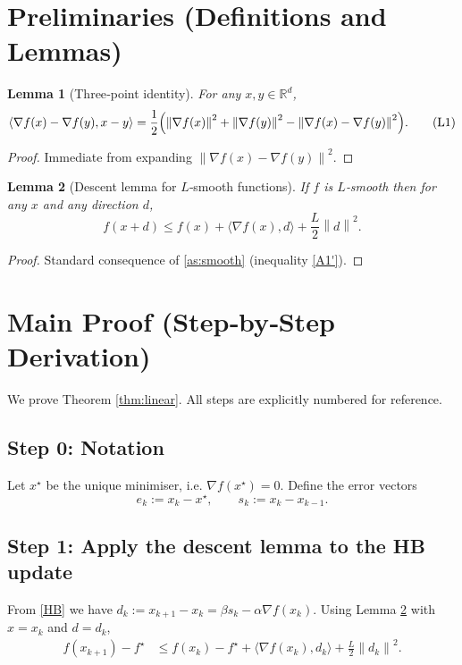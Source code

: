 \documentclass[11pt]{article}
\newtheorem{lemma}{Lemma}
\newcommand{\norm}[1]{\left\lVert#1\right\rVert}
\newcommand{\R}{\mathbb{R}}
\begin{document}
\newpage
\section*{Preliminaries (Definitions and Lemmas)}
\begin{lemma}[Three‑point identity]\label{lem:3pt}
For any $x,y\in\R^{d}$,
\[
\langle\nabla f(x)-\nabla f(y),x-y\rangle
= \frac12\Bigl(\norm{\nabla f(x)}^{2}+\norm{\nabla f(y)}^{2}
               -\norm{\nabla f(x)-\nabla f(y)}^{2}\Bigr).
\tag{L1}
\]
\end{lemma}
\begin{proof}
Immediate from expanding $\norm{\nabla f(x)-\nabla f(y)}^{2}$.
\end{proof}

\begin{lemma}[Descent lemma for $L$‑smooth functions]\label{lem:descent}
If $f$ is $L$‑smooth then for any $x$ and any direction $d$,
\[
f(x+d)\le f(x)+\langle\nabla f(x),d\rangle+\frac{L}{2}\norm{d}^{2}.
\tag{L2}
\]
\end{lemma}
\begin{proof}
Standard consequence of \ref{as:smooth} (inequality \eqref{A1'}).
\end{proof}

\section*{Main Proof (Step‑by‑Step Derivation)}
We prove Theorem \ref{thm:linear}.  All steps are explicitly numbered for reference.

\subsection*{Step 0: Notation}
Let $x^{\star}$ be the unique minimiser, i.e. $\nabla f(x^{\star})=0$.  Define the error vectors
\[
e_{k}:=x_{k}-x^{\star},\qquad
s_{k}:=x_{k}-x_{k-1}.
\]

\subsection*{Step 1: Apply the descent lemma to the HB update}
From \eqref{HB} we have $d_{k}:=x_{k+1}-x_{k}= \beta s_{k}-\alpha\nabla f(x_{k})$.
Using Lemma \ref{lem:descent} with $x=x_{k}$ and $d=d_{k}$,
\[
\begin{aligned}
f(x_{k+1})-f^{\star}
&\le f(x_{k})-f^{\star}
   +\langle\nabla f(x_{k}),d_{k}\rangle
   +\frac{L}{2}\norm{d_{k}}^{2}. \tag{Step 1}
\end{aligned}
\]
\end{document}
